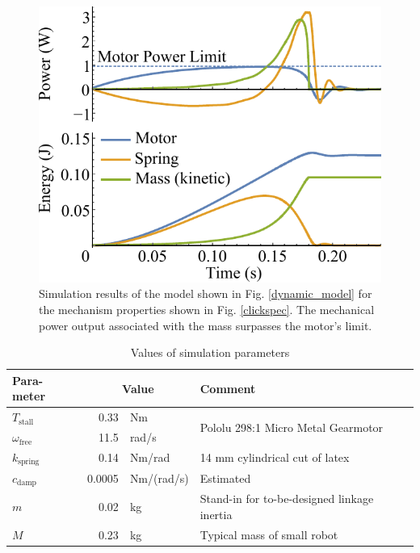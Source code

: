\documentclass[journal]{IEEEtran}
\begin{document}
\begin{figure}[b]
\centering
\includegraphics[scale=0.55]{simulation_results}
\caption{Simulation results of the model shown in Fig. \ref{dynamic_model} for the mechanism properties shown in Fig. \ref{clickspec}.  The mechanical power output associated with the mass surpasses the motor's limit.}
\label{simulation_results}
\end{figure}

\begin{table}[!b]
\caption{Values of simulation parameters}
\label{simulation_parameters}
\centering
\begin{tabular}{|m{6mm}|r@{ }l|m{48mm}|}
\hline
\textbf{Para-meter} & \multicolumn{2}{c|}{\textbf{Value}} & \textbf{Comment} \\
\hline
$T_\text{stall}$ & 0.33 & Nm & \multirow{2}[4]{*}{Pololu 298:1 Micro Metal Gearmotor} \\
\cline{1-3}$\omega_\text{free}$ & 11.5 & rad/s &  \\
\hline
$k_\text{spring}$ & 0.14 & Nm/rad & 14 mm cylindrical cut of latex \\
\hline
$c_\text{damp}$ & 0.0005 & Nm/(rad/s) & Estimated \\
\hline
$m$ & 0.02 & kg & Stand-in for to-be-designed linkage inertia \\
\hline
$M$ & 0.23 & kg & Typical mass of small robot \\
\hline
\end{tabular}
\end{table}
\end{document}
